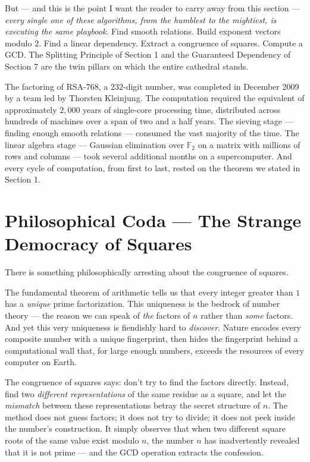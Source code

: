 \documentclass[11pt,twoside,openright]{book}
\theoremstyle{definition}
\theoremstyle{remark}
\begin{document}
But --- and this is the point I want the reader to carry away from this section --- \textit{every single one of these algorithms, from the humblest to the mightiest, is executing the same playbook}. Find smooth relations. Build exponent vectors modulo $2$. Find a linear dependency. Extract a congruence of squares. Compute a GCD. The Splitting Principle of Section 1 and the Guaranteed Dependency of Section 7 are the twin pillars on which the entire cathedral stands.

The factoring of RSA-768, a $232$-digit number, was completed in December 2009 by a team led by Thorsten Kleinjung. The computation required the equivalent of approximately $2{,}000$ years of single-core processing time, distributed across hundreds of machines over a span of two and a half years. The sieving stage --- finding enough smooth relations --- consumed the vast majority of the time. The linear algebra stage --- Gaussian elimination over $\mathbb{F}_2$ on a matrix with millions of rows and columns --- took several additional months on a supercomputer. And every cycle of computation, from first to last, rested on the theorem we stated in Section 1.



\section{Philosophical Coda --- The Strange Democracy of Squares}

There is something philosophically arresting about the congruence of squares.

The fundamental theorem of arithmetic tells us that every integer greater than $1$ has a \textit{unique} prime factorization. This uniqueness is the bedrock of number theory --- the reason we can speak of \textit{the} factors of $n$ rather than \textit{some} factors. And yet this very uniqueness is fiendishly hard to \textit{discover}. Nature encodes every composite number with a unique fingerprint, then hides the fingerprint behind a computational wall that, for large enough numbers, exceeds the resources of every computer on Earth.

The congruence of squares says: don't try to find the factors directly. Instead, find two \textit{different representations} of the same residue as a square, and let the \textit{mismatch} between these representations betray the secret structure of $n$. The method does not guess factors; it does not try to divide; it does not peek inside the number's construction. It simply observes that when two different square roots of the same value exist modulo $n$, the number $n$ has inadvertently revealed that it is not prime --- and the GCD operation extracts the confession.
\end{document}
